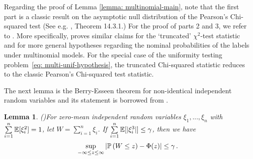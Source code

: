 \documentclass[11pt]{article}
\newtheorem{lemma}[propo]{Lemma}
\begin{document}
Regarding the proof of Lemma \ref{lemma: multinomial-main}, note that the first part is a classic result on the asymptotic null distribution of the Pearson's Chi-squared test (See e.g. \cite{lehmann2006testing}, Theorem 14.3.1.)
For the proof of parts 2 and 3, we refer to \cite{balakrishnan2019hypothesis}. More specifically, \cite{balakrishnan2019hypothesis} proves similar claims for the `truncated' $\chi^2$-test statistic and for more general hypotheses regarding the nominal probabilities of the labels under multinomial models. For the special case of the uniformity testing problem~\eqref{eq: multi-unif-hypothesis}, the truncated Chi-squared statistic reduces to the classic Pearson's Chi-squared test statistic.








The next lemma is the Berry-Esseen theorem for non-identical independent random variables and its statement is borrowed from 
\cite[Section 5]{barbour2005introduction}.
%
\begin{lemma}(\cite[Section 5]{barbour2005introduction})\label{lemma: berry-essen}
For zero-mean independent random variables $\xi_1,...,\xi_n$ with $\sum\limits_{i=1}^{n}{\mathbb E}[\xi_i^2]=1$, let $W=\sum\limits_{i=1}^{n}\xi_i$. If $\sum\limits_{i=1}^{n}{\mathbb E}[|\xi_i^3|]\leq \gamma$, then we have
%
\[
\sup\limits_{-\infty\leq z\leq \infty}^{}\left|{\mathbb P}\left(W \leq z  \right)-\Phi(z) \right| \leq \gamma\,.
\]
\end{lemma}
\end{document}
